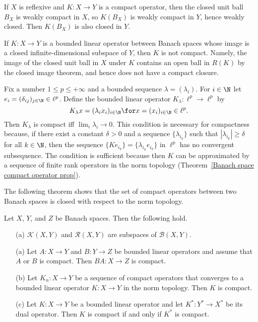 \begin{example}
If $X$ is reflexive and $K:X\to Y$ is a compact operator, then the closed unit ball $B_X$ is weakly compact in $X$, so $K(B_X)$ is weakly compact in $Y$, hence weakly closed. Then $K(B_X)$ is also closed in $Y$.
\end{example}
\begin{example}
If $K:X\to Y$ is a bounded linear operator between Banach spaces whose image is a closed infinite-dimensional subspace of $Y$, then $K$ is not compact. Namely, the image of the closed unit ball in $X$ under $K$ contains an open ball in $R(K)$ by the closed image theorem, and hence does not have a compact closure.
\end{example}
\begin{example}
Fix a number $1\leq p\leq+\infty$ and a bounded sequence $\lambda=(\lambda_i)$. For $i\in\N$ let $e_i=(\delta_{ij})_{j\in\N}\in\ell^p$. Define the bounded linear operator $K_\lambda:\ell^p\to\ell^p$ by
\[K_\lambda x=(\lambda_ix_i)_{i\in\N}\for x=(x_i)_{i\in\N}\in\ell^p.\]
Then $K_\lambda$ is compact iff $\lim_i\lambda_i\to 0$. This condition is necessary for compactness because, if there exist a constant $\delta>0$ and a sequence $\{\lambda_{i_k}\}$ such that $|\lambda_{i_k}|\geq\delta$ for all $k\in\N$, then the sequence $\{Ke_{i_k}\}=\{\lambda_{i_k}e_{i_k}\}$ in $\ell^p$ has no convergent subsequence. The condition is sufficient because then $K$ can be approximated by a sequence of finite rank operators in the norm topology (Theorem~\ref{Banach space compact operator prop}).
\end{example}
The following theorem shows that the set of compact operators between two Banach spaces is closed with respect to the norm topology.
\begin{theorem}\label{Banach space compact operator prop}
Let $X$, $Y$, and $Z$ be Banach spaces. Then the following hold.
\begin{itemize}
\item[(a)] $\mathcal{K}(X,Y)$ and $\mathcal{R}(X,Y)$ are subspaces of $\mathcal{B}(X,Y)$.
\item[(a)] Let $A:X\to Y$ and $B:Y\to Z$ be bounded linear operators and assume that $A$ or $B$ is compact. Then $BA:X\to Z$ is compact.
\item[(b)] Let $K_n:X\to Y$ be a sequence of compact operators that converges to a bounded linear operator $K:X\to Y$ in the norm topology. Then $K$ is compact.
\item[(c)] Let $K:X\to Y$ be a bounded linear operator and let $K^*:Y^*\to X^*$ be its dual operator. Then $K$ is compact if and only if $K^*$ is compact. 
\end{itemize}
\end{theorem}
